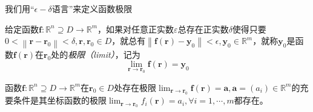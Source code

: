 \documentclass[main.tex]{subfiles}
\begin{document}
我们用“$\epsilon-\delta$语言”来定义函数极限

\begin{definition}[向量函数的极限]\label{def:II.4.5}
    给定函数$\mathbf{f}:\mathbb{R}^n\supseteq D\rightarrow\mathbb{R}^m$，如果对任意正实数$\varepsilon$总存在正实数$\delta$使得只要$0<\left\|\mathbf{r}-\mathbf{r}_0\right\|<\delta,\mathbf{r},\mathbf{r}_0\in D$，就总有$\left\|\mathbf{f}\left(\mathbf{r}\right)-\mathbf{y}_0\right\|<\epsilon,\mathbf{y}_0\in\mathbb{R}^m$，就称$\mathbf{y}_0$是函数$\mathbf{f}\left(\mathbf{r}\right)$在$\mathbf{r}_0$处的\emph{极限（limit）}，记为
    \[\lim_{\mathbf{r} \to\mathbf{r}_0} \mathbf{f}\left(\mathbf{r}\right)=\mathbf{y}_0\]
\end{definition}

\begin{theorem}\label{thm:II.4.1}
    函数$\mathbf{f}:\mathbb{R}^n\supseteq D\rightarrow\mathbb{R}^m$在$\mathbf{r}_0\in D$处存在极限$\lim_{\mathbf{r}\to\mathbf{r}_0}\mathbf{f}\left(\mathbf{r}\right)=\mathbf{a},\mathbf{a}=\left(a_i\right)\in\mathbb{R}^m$的充要条件是其坐标函数的极限$\lim_{\mathbf{r}\to\mathbf{r}_0}f_i\left(\mathbf{r}\right)=a_i,\forall i=1,\cdots,m$都存在。
\end{theorem}
\end{document}
